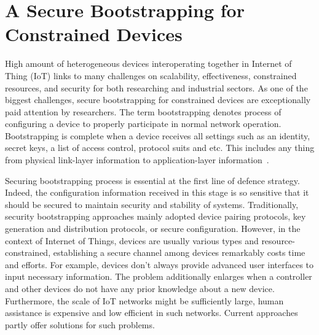 \chapter{A Secure Bootstrapping for Constrained Devices} %

\label{Chapter5} %



High amount of heterogeneous devices interoperating together in Internet of Thing (IoT) links to many challenges on scalability, effectiveness, constrained resources, and security for both researching and industrial sectors. As one of the biggest challenges, secure bootstrapping for constrained devices are exceptionally paid attention by researchers. The term bootstrapping denotes process of configuring a device to properly participate in normal network operation. Bootstrapping is complete when a device receives all settings such as an identity, secret keys, a list of access control, protocol suits and etc. This includes any thing from physical link-layer information to application-layer information~\cite{secureboot}. 

Securing bootstrapping process is essential at the first line of defence strategy. Indeed, the configuration information received in this stage is so sensitive that it should be secured to maintain security and stability of systems. Traditionally, security bootstrapping approaches mainly adopted device pairing protocols, key generation and distribution protocols, or secure configuration. However, in the context of Internet of Things, devices are usually various types and resource-constrained, establishing a secure channel among devices remarkably costs time and efforts. For example, devices don't always provide advanced user interfaces to input necessary information. The problem additionally enlarges when a controller and other devices do not have any prior knowledge about a new device. Furthermore, the scale of IoT networks might be sufficiently large, human assistance is expensive and low efficient in such networks. Current approaches partly offer solutions for such problems. 

